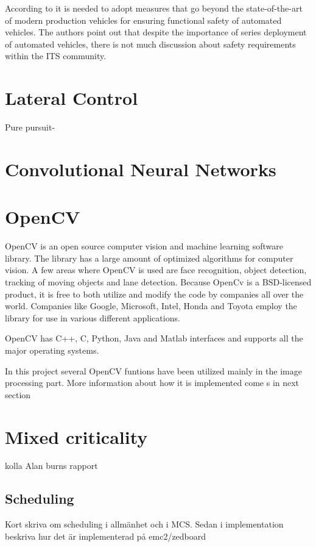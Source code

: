According to \cite{stolte2016safety} it is needed to adopt measures that go beyond the state-of-the-art of modern production vehicles for ensuring functional safety of automated vehicles. The authors point out that despite the importance of series deployment of automated vehicles, there is not much discussion about safety requirements within the ITS community. 


\section{Lateral Control}
Pure pursuit-
\section{Convolutional Neural Networks}


\section{OpenCV}
OpenCV is an open source computer vision and machine learning software library. The library has a large amount of optimized algorithms for computer vision. A few areas where OpenCV is used are face recognition, object detection, tracking of moving objects and lane detection. Because OpenCv is a BSD-licensed product, it is free to both utilize and modify the code by companies all over the world. Companies like Google, Microsoft, Intel, Honda and Toyota employ the library for use in various different applications.

OpenCV has C++, C, Python, Java and Matlab interfaces and supports all the major operating systems.

In this project several OpenCV funtions have been utilized mainly in the image processing part. More information about how it is implemented come s in next section \cite{opencv}

\section{Mixed criticality}
kolla Alan burns rapport
\subsection{Scheduling}
Kort skriva om scheduling i allmänhet och i MCS. Sedan i implementation beskriva hur det är implementerad på emc2/zedboard